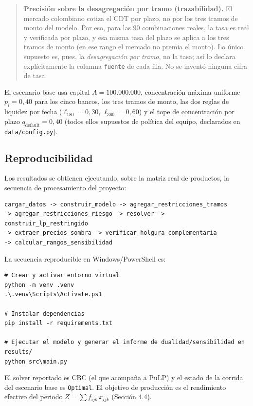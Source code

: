 \documentclass[11pt,a4paper]{article}
\begin{document}
\begin{quote}
\textbf{Precisión sobre la desagregación por tramo (trazabilidad).} El mercado
colombiano cotiza el CDT por plazo, no por los tres tramos de monto del
modelo. Por eso, para las 90 combinaciones reales, la tasa es real y verificada
por plazo, y esa misma tasa del plazo se aplica a los tres tramos de monto
(en ese rango el mercado no premia el monto). Lo único supuesto es, pues, la
\emph{desagregación por tramo}, no la tasa; así lo declara explícitamente la columna
\texttt{fuente} de cada fila. No se inventó ninguna cifra de tasa.
\end{quote}

El escenario base usa capital $A = 100.000.000$, concentración máxima uniforme
$p_i = 0{,}40$ para los cinco bancos, los tres tramos de monto, las dos reglas de
liquidez por fecha ($\ell_{180} = 0{,}30$, $\ell_{360} = 0{,}60$) y el tope de
concentración por plazo $q_{\text{default}} = 0{,}40$ (todos ellos supuestos de
política del equipo, declarados en \texttt{data/config.py}).

\subsection{Reproducibilidad}

Los resultados se obtienen ejecutando, sobre la matriz real de productos, la secuencia de
procesamiento del proyecto:

\begin{lstlisting}[language={}]
cargar_datos -> construir_modelo -> agregar_restricciones_tramos
-> agregar_restricciones_riesgo -> resolver -> construir_lp_restringido
-> extraer_precios_sombra -> verificar_holgura_complementaria
-> calcular_rangos_sensibilidad
\end{lstlisting}

La secuencia reproducible en Windows/PowerShell es:

\begin{lstlisting}[language={}]
# Crear y activar entorno virtual
python -m venv .venv
.\.venv\Scripts\Activate.ps1

# Instalar dependencias
pip install -r requirements.txt

# Ejecutar el modelo y generar el informe de dualidad/sensibilidad en results/
python src\main.py
\end{lstlisting}

El solver reportado es CBC (el que acompaña a PuLP) y el estado de la corrida
del escenario base es \texttt{Optimal}. El objetivo de producción es el rendimiento
efectivo del periodo $Z = \sum f_{ijk}\,x_{ijk}$ (Sección 4.4).
\end{document}

